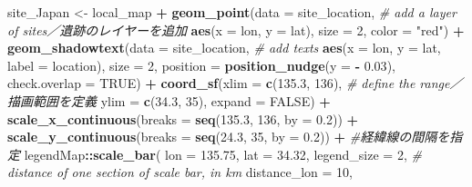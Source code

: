 \documentclass[
  xelatex,ja=standard]{bxjsarticle}
\newenvironment{Shaded}{\begin{snugshade}}{\end{snugshade}}
\newcommand{\CommentTok}[1]{\textcolor[rgb]{0.56,0.35,0.01}{\textit{#1}}}
\newcommand{\DataTypeTok}[1]{\textcolor[rgb]{0.13,0.29,0.53}{#1}}
\newcommand{\DecValTok}[1]{\textcolor[rgb]{0.00,0.00,0.81}{#1}}
\newcommand{\FloatTok}[1]{\textcolor[rgb]{0.00,0.00,0.81}{#1}}
\newcommand{\KeywordTok}[1]{\textcolor[rgb]{0.13,0.29,0.53}{\textbf{#1}}}
\newcommand{\NormalTok}[1]{#1}
\newcommand{\OperatorTok}[1]{\textcolor[rgb]{0.81,0.36,0.00}{\textbf{#1}}}
\newcommand{\OtherTok}[1]{\textcolor[rgb]{0.56,0.35,0.01}{#1}}
\newcommand{\StringTok}[1]{\textcolor[rgb]{0.31,0.60,0.02}{#1}}
\begin{document}
\begin{Shaded}
\begin{Highlighting}[]
\NormalTok{site_Japan <-}\StringTok{ }
\StringTok{  }\NormalTok{local_map }\OperatorTok{+}
\StringTok{  }\KeywordTok{geom_point}\NormalTok{(}\DataTypeTok{data =}\NormalTok{ site_location, }\CommentTok{# add a layer of sites／遺跡のレイヤーを追加  }
             \KeywordTok{aes}\NormalTok{(}\DataTypeTok{x =}\NormalTok{ lon,}
                 \DataTypeTok{y =}\NormalTok{ lat),}
             \DataTypeTok{size =} \DecValTok{2}\NormalTok{,}
             \DataTypeTok{color =} \StringTok{"red"}\NormalTok{) }\OperatorTok{+}
\StringTok{  }\KeywordTok{geom_shadowtext}\NormalTok{(}\DataTypeTok{data =}\NormalTok{ site_location, }\CommentTok{# add texts }
                  \KeywordTok{aes}\NormalTok{(}\DataTypeTok{x =}\NormalTok{ lon,}
                      \DataTypeTok{y =}\NormalTok{ lat,}
                      \DataTypeTok{label =}\NormalTok{ location),}
                  \DataTypeTok{size =} \DecValTok{2}\NormalTok{,}
                  \DataTypeTok{position =} \KeywordTok{position_nudge}\NormalTok{(}\DataTypeTok{y =} \OperatorTok{-}\StringTok{ }\FloatTok{0.03}\NormalTok{),}
                  \DataTypeTok{check.overlap =} \OtherTok{TRUE}\NormalTok{) }\OperatorTok{+}
\StringTok{  }\KeywordTok{coord_sf}\NormalTok{(}\DataTypeTok{xlim =} \KeywordTok{c}\NormalTok{(}\FloatTok{135.3}\NormalTok{, }\DecValTok{136}\NormalTok{), }\CommentTok{# define the range／描画範囲を定義  }
           \DataTypeTok{ylim =} \KeywordTok{c}\NormalTok{(}\FloatTok{34.3}\NormalTok{, }\DecValTok{35}\NormalTok{),}
           \DataTypeTok{expand =} \OtherTok{FALSE}\NormalTok{) }\OperatorTok{+}
\StringTok{  }\KeywordTok{scale_x_continuous}\NormalTok{(}\DataTypeTok{breaks =} \KeywordTok{seq}\NormalTok{(}\FloatTok{135.3}\NormalTok{, }\DecValTok{136}\NormalTok{, }\DataTypeTok{by =} \FloatTok{0.2}\NormalTok{)) }\OperatorTok{+}\StringTok{ }
\StringTok{  }\KeywordTok{scale_y_continuous}\NormalTok{(}\DataTypeTok{breaks =} \KeywordTok{seq}\NormalTok{(}\FloatTok{24.3}\NormalTok{, }\DecValTok{35}\NormalTok{, }\DataTypeTok{by =} \FloatTok{0.2}\NormalTok{)) }\OperatorTok{+}\StringTok{  }\CommentTok{#経緯線の間隔を指定  }
\StringTok{  }\NormalTok{legendMap}\OperatorTok{::}\KeywordTok{scale_bar}\NormalTok{( }
    \DataTypeTok{lon =} \FloatTok{135.75}\NormalTok{,}
    \DataTypeTok{lat =} \FloatTok{34.32}\NormalTok{,}
    \DataTypeTok{legend_size =} \DecValTok{2}\NormalTok{,}
    \CommentTok{# distance of one section of scale bar, in km}
    \DataTypeTok{distance_lon =} \DecValTok{10}\NormalTok{,}

\end{Highlighting}
\end{Shaded}
\end{document}

